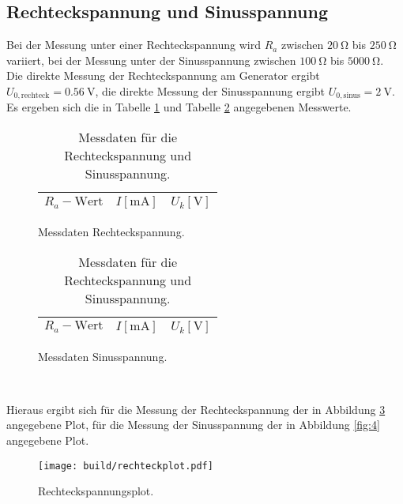 \subsection{Rechteckspannung und Sinusspannung}
Bei der Messung unter einer Rechteckspannung wird $R_a$ zwischen $\SI{20}{\ohm}$ bis $\SI{250}{\ohm}$ variiert, bei der Messung unter der Sinusspannung zwischen $\SI{100}{\ohm}$ bis $\SI{5000}{\ohm}$. \\
Die direkte Messung der Rechteckspannung am Generator ergibt $U_{0, \text{rechteck}} = \SI{0.56}{\volt}$, die direkte Messung der Sinusspannung ergibt $U_{0, \text{sinus}} = \SI{2}{\volt}$.
Es ergeben sich die in Tabelle \ref{tab:3} und Tabelle \ref{tab:4} angegebenen Messwerte.
\begin{table}[H]
  \hspace*{\fill}
  \begin{subfigure}{0.40\textwidth}
  \centering
  \caption{Messdaten Rechteckspannung.}
  \label{tab:3}
  \begin{tabular}{c c c}
    \toprule
    {$R_a-\text{Wert}$} & {$I [\si{\milli\ampere}]$} & {$U_k [\si{\volt}]$} \\
    \midrule
    
    \bottomrule
  \end{tabular}
\end{subfigure}
\hspace*{\fill}
\begin{subfigure}{0.40\textwidth}
  \centering
  \caption{Messdaten Sinusspannung.}
  \label{tab:4}
  \begin{tabular}{c c c}
    \toprule
    {$R_a-\text{Wert}$} & {$I [\si{\milli\ampere}]$} & {$U_k [\si{\volt}]$} \\
    \midrule
    
    \bottomrule
  \end{tabular}
\end{subfigure}
\\
\hspace*{\fill}
\hspace*{\fill}
\caption{Messdaten für die Rechteckspannung und Sinusspannung.}
\end{table}
Hieraus ergibt sich für die Messung der Rechteckspannung der in Abbildung \ref{fig:3} angegebene Plot, für die Messung der Sinusspannung der in Abbildung \ref{fig:4} angegebene Plot.
\begin{figure}[H]
  \centering
  \texttt{[image: build/rechteckplot.pdf]}
  \caption{Rechteckspannungsplot.}
  \label{fig:3}
\end{figure}
